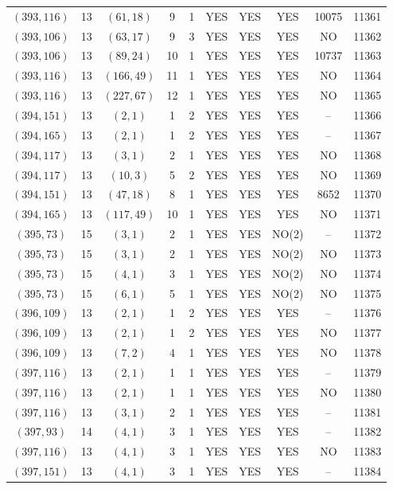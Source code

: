\begin{longtable}{|c|c|c|c|c|c|c|c|c|c|}
$(393, 116)$ & 13 & $(61, 18)$ & 9 & 1 & YES & YES & YES & 10075 & 11361\\
$(393, 106)$ & 13 & $(63, 17)$ & 9 & 3 & YES & YES & YES & NO & 11362\\
$(393, 106)$ & 13 & $(89, 24)$ & 10 & 1 & YES & YES & YES & 10737 & 11363\\
$(393, 116)$ & 13 & $(166, 49)$ & 11 & 1 & YES & YES & YES & NO & 11364\\
$(393, 116)$ & 13 & $(227, 67)$ & 12 & 1 & YES & YES & YES & NO & 11365\\
$(394, 151)$ & 13 & $(2, 1)$ & 1 & 2 & YES & YES & YES & -- & 11366\\
$(394, 165)$ & 13 & $(2, 1)$ & 1 & 2 & YES & YES & YES & -- & 11367\\
$(394, 117)$ & 13 & $(3, 1)$ & 2 & 1 & YES & YES & YES & NO & 11368\\
$(394, 117)$ & 13 & $(10, 3)$ & 5 & 2 & YES & YES & YES & NO & 11369\\
$(394, 151)$ & 13 & $(47, 18)$ & 8 & 1 & YES & YES & YES & 8652 & 11370\\
$(394, 165)$ & 13 & $(117, 49)$ & 10 & 1 & YES & YES & YES & NO & 11371\\
$(395, 73)$ & 15 & $(3, 1)$ & 2 & 1 & YES & YES & NO(2) & -- & 11372\\
$(395, 73)$ & 15 & $(3, 1)$ & 2 & 1 & YES & YES & NO(2) & NO & 11373\\
$(395, 73)$ & 15 & $(4, 1)$ & 3 & 1 & YES & YES & NO(2) & NO & 11374\\
$(395, 73)$ & 15 & $(6, 1)$ & 5 & 1 & YES & YES & NO(2) & NO & 11375\\
$(396, 109)$ & 13 & $(2, 1)$ & 1 & 2 & YES & YES & YES & -- & 11376\\
$(396, 109)$ & 13 & $(2, 1)$ & 1 & 2 & YES & YES & YES & NO & 11377\\
$(396, 109)$ & 13 & $(7, 2)$ & 4 & 1 & YES & YES & YES & NO & 11378\\
$(397, 116)$ & 13 & $(2, 1)$ & 1 & 1 & YES & YES & YES & -- & 11379\\
$(397, 116)$ & 13 & $(2, 1)$ & 1 & 1 & YES & YES & YES & NO & 11380\\
$(397, 116)$ & 13 & $(3, 1)$ & 2 & 1 & YES & YES & YES & -- & 11381\\
$(397, 93)$ & 14 & $(4, 1)$ & 3 & 1 & YES & YES & YES & -- & 11382\\
$(397, 116)$ & 13 & $(4, 1)$ & 3 & 1 & YES & YES & YES & NO & 11383\\
$(397, 151)$ & 13 & $(4, 1)$ & 3 & 1 & YES & YES & YES & -- & 11384\\

\end{longtable}
